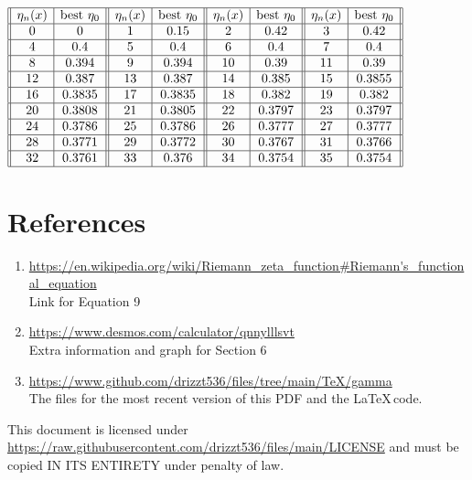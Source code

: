 \documentclass[12pt]{article}
\providecommand \nvpx [1] {\vspace{-#1px}}
\begin{document}
\centerline{$\begin{array}{| |c|c| |c|c| |c|c| |c|c| |}
	\hline
	\eta_n(x) & \text{best }\eta_0 &
	\eta_n(x) & \text{best }\eta_0 &
	\eta_n(x) & \text{best }\eta_0 &
	\eta_n(x) & \text{best }\eta_0 \\

	\hline 0  & 0      & 1  & 0.15   & 2  & 0.42   & 3  & 0.42   \\
	\hline 4  & 0.4    & 5  & 0.4    & 6  & 0.4    & 7  & 0.4    \\
	\hline 8  & 0.394  & 9  & 0.394  & 10 & 0.39   & 11 & 0.39   \\
	\hline 12 & 0.387  & 13 & 0.387  & 14 & 0.385  & 15 & 0.3855 \\
	\hline 16 & 0.3835 & 17 & 0.3835 & 18 & 0.382  & 19 & 0.382  \\
	\hline 20 & 0.3808 & 21 & 0.3805 & 22 & 0.3797 & 23 & 0.3797 \\
	\hline 24 & 0.3786 & 25 & 0.3786 & 26 & 0.3777 & 27 & 0.3777 \\
	\hline 28 & 0.3771 & 29 & 0.3772 & 30 & 0.3767 & 31 & 0.3766 \\
	\hline 32 & 0.3761 & 33 & 0.376  & 34 & 0.3754 & 35 & 0.3754 \\
	\hline
\end{array}$}\vspace{-1em}

\pagebreak
\section{References}

	\begin{enumerate}
		\item \url{https://en.wikipedia.org/wiki/Riemann_zeta_function#Riemann's_functional_equation}\\
			Link for Equation 9
		\item \url{https://www.desmos.com/calculator/qnnylllsvt}\\
			Extra information and graph for Section 6
		\item \url{https://www.github.com/drizzt536/files/tree/main/TeX/gamma}\\
			The files for the most recent version of this PDF and the \LaTeX $\,$code.
	\end{enumerate}
	\vfill
	\small
	\noindent This document is licensed under
	\url{https://raw.githubusercontent.com/drizzt536/files/main/LICENSE}
	and must be copied IN ITS ENTIRETY under penalty of law.
	\nvpx{20}
\end{document}
